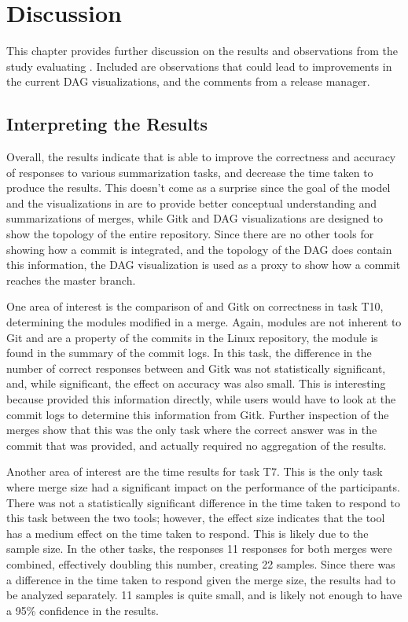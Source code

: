 \chapter{Discussion}\label{chap:discussion}

This chapter provides further discussion on the results and observations
from the study evaluating \tool{}. Included are observations that could
lead to improvements in the current DAG visualizations, and the comments
from a release manager.


\section{Interpreting the Results}\label{sec:interpreting_the_results}

Overall, the results indicate that \tool{} is able to improve the
correctness and accuracy of responses to various summarization tasks,
and decrease the time taken to produce the results. This doesn't come as
a surprise since the goal of the \mt{} model and the visualizations in
\tool{} are to provide better conceptual understanding and
summarizations of merges, while Gitk and DAG visualizations are designed
to show the topology of the entire repository. Since there are no other
tools for showing how a commit is integrated, and the topology of the
DAG does contain this information, the DAG visualization is used as a
proxy to show how a commit reaches the master branch.

One area of interest is the comparison of \tool{} and Gitk on
correctness in task T10, determining the modules modified in a merge.
Again, modules are not inherent to Git and are a property of the commits
in the Linux repository, the module is found in the summary of the
commit logs. In this task, the difference in the number of correct
responses between \tool{} and Gitk was not statistically significant,
and, while significant, the effect on accuracy was also small.
This is
interesting because \tool{} provided this information directly, while
users would have to look at the commit logs to determine this
information from Gitk.
Further inspection of the merges show that this
was the only task where the correct answer was in the commit that was
provided, and actually required no aggregation of the results.

Another area of interest are the time results for task T7. This is the
only task where merge size had a significant impact on the performance
of the participants. There was not a statistically significant
difference in the time taken to respond to this task between the two
tools; however, the effect size indicates that the tool has a medium
effect on the time taken to respond. This is likely due to the sample
size. In the other tasks, the responses 11 responses for both merges
were combined, effectively doubling this number, creating 22 samples.
Since there was a difference in the time taken to respond given the
merge size, the results had to be analyzed separately. 11 samples is
quite small, and is likely not enough to have a 95\% confidence in the
results.


